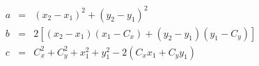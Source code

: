 \documentclass[12pt]{article}
\begin{document}
\[
    \begin{array}{rcl}
        a &=& (x_2 - x_1)^2 + (y_2 - y_1)^2 \\
        b &=& 2[(x_2 - x_1)(x_1 - C_x) + (y_2 - y_1)(y_1 - C_y)] \\
        c &=& C_x^2 + C_y^2 + x_1^2 + y_1^2 - 2(C_xx_1 + C_yy_1)
    \end{array}
\]
\end{document}
